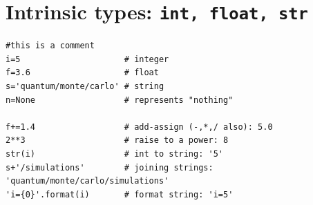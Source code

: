\documentclass[oneside,11pt]{memoir}
\numberwithin{equation}{section}
\begin{document}
\section{Intrinsic types: \texttt{int, float, str}}
\begin{shaded}
\begin{verbatim}
#this is a comment
i=5                     # integer
f=3.6                   # float
s='quantum/monte/carlo' # string
n=None                  # represents "nothing"

f+=1.4                  # add-assign (-,*,/ also): 5.0
2**3                    # raise to a power: 8
str(i)                  # int to string: '5'
s+'/simulations'        # joining strings: 'quantum/monte/carlo/simulations'
'i={0}'.format(i)       # format string: 'i=5'

\end{verbatim}
\end{shaded}

 
\end{document}
